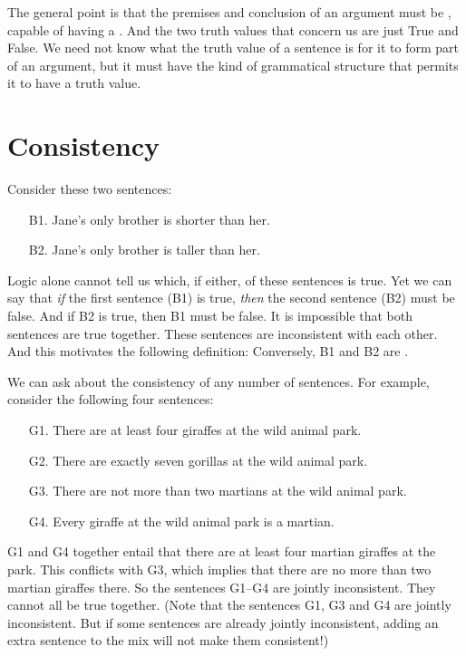 The general point is that the premises and conclusion of an argument must be , capable of having a . And the two truth values that concern us are just True and False. We need not know what the truth value of a sentence is for it to form part of an argument, but it must have the kind of grammatical structure that permits it to have a truth value.


\section{Consistency}
Consider these two sentences:
	\begin{itemize}
		\item[B1.] Jane's only brother is shorter than her.
		\item[B2.] Jane's only brother is taller than her.
	\end{itemize}
Logic alone cannot tell us which, if either, of these sentences is true. Yet we can say that \emph{if} the first sentence (B1) is true, \emph{then} the second sentence (B2) must be false. And if B2 is true, then B1 must be false. It is impossible that both sentences are true together. These sentences are inconsistent with each other. And this motivates the following definition:
Conversely, B1 and B2 are .

We can ask about the consistency of any number of sentences. For example, consider the following four sentences:
	\label{MartianGiraffes}
	\begin{itemize}
		\item[G1.] There are at least four giraffes at the wild animal park.
		\item[G2.] There are exactly seven gorillas at the wild animal park.
		\item[G3.] There are not more than two martians at the wild animal park.
		\item[G4.] Every giraffe at the wild animal park is a martian.
	\end{itemize}
G1 and G4 together entail that there are at least four martian giraffes at the park. This conflicts with G3, which implies that there are no more than two martian giraffes there. So the sentences G1–G4 are jointly inconsistent. They cannot all be true together. (Note that the sentences G1, G3 and G4 are jointly inconsistent. But if some sentences are already jointly inconsistent, adding an extra sentence to the mix will not make them consistent!)

